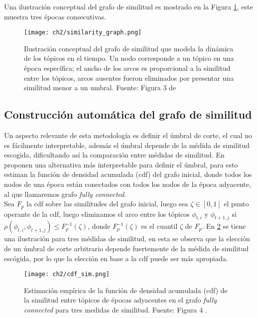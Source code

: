 Una ilustración conceptual del grafo de similitud es mostrado en la Figura \ref{img:graph}, este muestra tres épocas consecutivas.

\begin{figure}
    \centering
    \texttt{[image: ch2/similarity\_graph.png]}
    \caption{Ilustración conceptual del grafo de similitud que modela la dinámica de los tópicos en el tiempo. Un nodo corresponde a un tópico en una época específica; el ancho de los arcos es proporcional a la similitud entre los tópicos, arcos ausentes fueron eliminados por presentar una similitud menor a un umbral. Fuente:  Figura 3 de \citep{beykikhoshk2018discovering}}
    \label{img:graph}
\end{figure}

\subsection{Construcción automática del grafo de similitud}
\label{sec:automatic_construction}

Un aspecto relevante de esta metodología es definir el úmbral de corte, el cual no es fácilmente interpretable, además el úmbral depende de la médida de similitud escogida, dificultando así la comparación entre médidas de similitud. En \citep{beykikhoshk2018discovering} proponen una alternativa más interpretable para definir el úmbral, para esto estiman la función de densidad acumulada (cdf) del grafo inicial, donde todos los nodos de una época están conectados con todos los nodos de la época adyacente, al que llamaremos grafo \textit{fully connected}. \\

Sea $F_{p}$ la cdf sobre las similitudes del grafo inicial, luego sea $\zeta \in [0,1]$ el punto operante de la cdf, luego eliminamos el arco entre los tópicos $\phi_{t,i}$ y $\phi_{t+1,j}$ si $\rho(\phi_{t,i}, \phi_{t+1,j})\leq F_{p}^{-1}(\zeta)$, donde  $F_{p}^{-1}(\zeta)$ es el cuantil $\zeta$ de $F_{p}$. En \ref{img:cdf_sim} se tiene una ilustración para tres médidas de similitud, en esta se observa que la elección de un úmbral de corte arbitrario depende fuertemente de la médida de similitud escógida, por lo que la elección en base a la cdf puede ser más apropiada.

\begin{figure}
    \centering
    \texttt{[image: ch2/cdf\_sim.png]}
    \caption{Estimación empírica de la función de densidad acumulada (cdf) de la similitud entre tópicos de épocas adyacentes en el grafo \textit{fully connected} para tres medidas de similitud. Fuente: Figura 4 \citep{beykikhoshk2018discovering}.}
    \label{img:cdf_sim}
\end{figure}